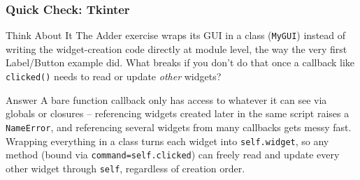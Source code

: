 \begin{frame}[fragile]\frametitle{Quick Check: Tkinter}
\begin{block}{Think About It}
The Adder exercise wraps its GUI in a class (\texttt{MyGUI}) instead of writing the widget-creation code directly at module level, the way the very first Label/Button example did. What breaks if you don't do that once a callback like \texttt{clicked()} needs to read or update \emph{other} widgets?
\end{block}
\pause
\begin{block}{Answer}
A bare function callback only has access to whatever it can see via globals or closures -- referencing widgets created later in the same script raises a \texttt{NameError}, and referencing several widgets from many callbacks gets messy fast. Wrapping everything in a class turns each widget into \texttt{self.widget}, so any method (bound via \texttt{command=self.clicked}) can freely read and update every other widget through \texttt{self}, regardless of creation order.
\end{block}
\end{frame}

